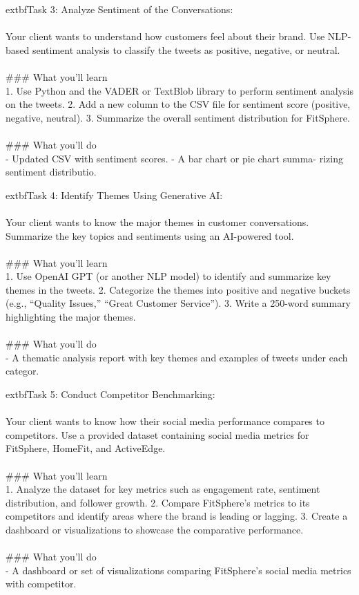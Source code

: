 \documentclass{article}
\begin{document}
	extbf{Task 3:} Analyze Sentiment of the Conversations:  \\
 \\
 Your client wants to understand how customers feel about their brand. Use NLP-based sentiment analysis to classify the tweets as positive, negative, or neutral. \\
 \\
### What you'll learn \\
1. Use Python and the VADER or TextBlob library to perform sentiment analysis on the tweets. 2. Add a new column to the CSV file for sentiment score (positive, negative, neutral). 3. Summarize the overall sentiment distribution for FitSphere. \\
 \\
### What you'll do \\
- Updated CSV with sentiment scores. - A bar chart or pie chart summa- rizing sentiment distributio.

	extbf{Task 4:} Identify Themes Using Generative AI:  \\
 \\
 Your client wants to know the major themes in customer conversations. Summarize the key topics and sentiments using an AI-powered tool. \\
 \\
### What you'll learn \\
1. Use OpenAI GPT (or another NLP model) to identify and summarize key themes in the tweets. 2. Categorize the themes into positive and negative buckets (e.g., “Quality Issues,” “Great Customer Service”). 3. Write a 250-word summary highlighting the major themes. \\
 \\
### What you'll do \\
- A thematic analysis report with key themes and examples of tweets under each categor.

	extbf{Task 5:} Conduct Competitor Benchmarking:  \\
 \\
 Your client wants to know how their social media performance compares to competitors. Use a provided dataset containing social media metrics for FitSphere, HomeFit, and ActiveEdge. \\
 \\
### What you'll learn \\
1. Analyze the dataset for key metrics such as engagement rate, sentiment distribution, and follower growth. 2. Compare FitSphere’s metrics to its competitors and identify areas where the brand is leading or lagging. 3. Create a dashboard or visualizations to showcase the comparative performance. \\
 \\
### What you'll do \\
- A dashboard or set of visualizations comparing FitSphere’s social media metrics with competitor.
\end{document}
